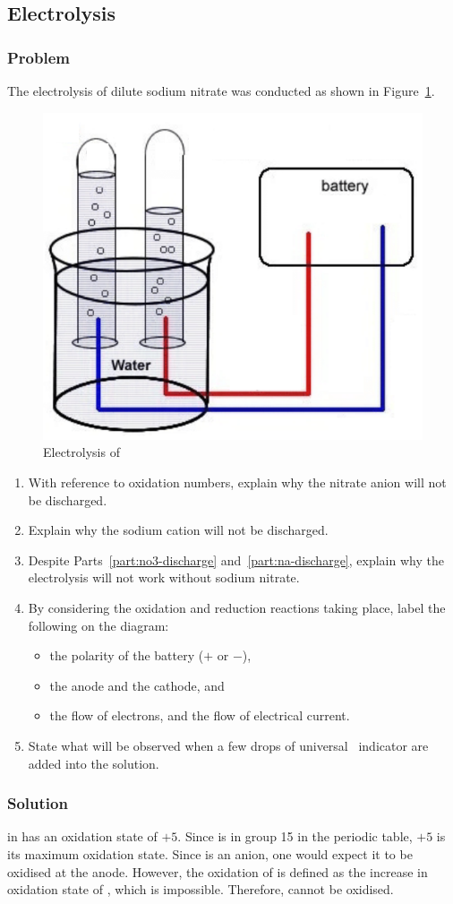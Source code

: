 \subsection{Electrolysis}
\subsubsection{Problem}
The electrolysis of dilute sodium nitrate was conducted as shown in Figure~\ref{fig:electrolysis-nano3}.
\begin{figure}[htpb]
	\centering
	\includegraphics[width=0.4\linewidth]{assets/09_electrolysis_nano3.png}
	\caption{Electrolysis of }
	\label{fig:electrolysis-nano3}
\end{figure}
\begin{enumerate}
	\item\label{part:no3-discharge} With reference to oxidation numbers, explain why the nitrate anion will not be discharged.
	\item\label{part:na-discharge} Explain why the sodium cation will not be discharged.
	\item Despite Parts~\ref{part:no3-discharge} and~\ref{part:na-discharge}, explain why
	      the electrolysis will not work without sodium nitrate.
	\item By considering the oxidation and reduction reactions taking place, label the following on the diagram:
	      \begin{itemize}
		      \item the polarity of the battery (\(+\) or \(-\)),
		      \item the anode and the cathode, and
		      \item the flow of electrons, and the flow of electrical current.
	      \end{itemize}
	\item State what will be observed when a few drops of universal \pH\ indicator
	      are added into the solution.
\end{enumerate}

\subsubsection{Solution}
 in  has an oxidation state of \(+5\). Since  is in
group 15 in the periodic table, \(+5\) is its maximum oxidation state. Since 
is an anion, one would expect it to be oxidised at the anode. However, the
oxidation of  is defined as the increase in oxidation state of ,
which is impossible. Therefore,  cannot be oxidised.

